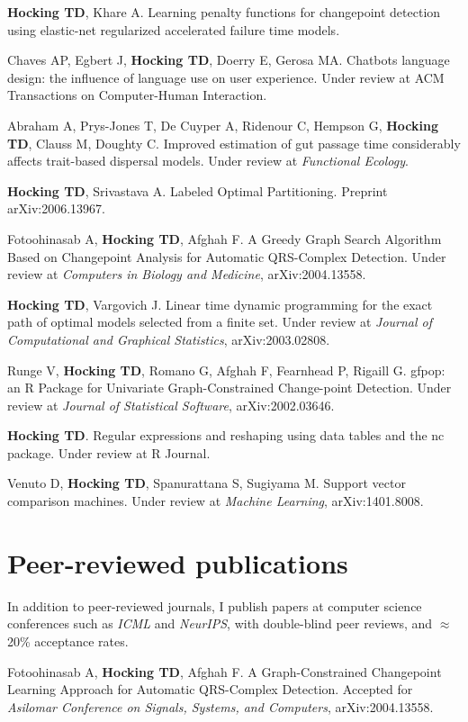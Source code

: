 \documentclass[margin,line]{res}
\begin{document}
\begin{resume}
{\bf Hocking TD}, Khare A. Learning penalty functions for changepoint
detection using elastic-net regularized accelerated failure time
models.

Chaves AP, Egbert J, {\bf Hocking TD}, Doerry E, Gerosa MA. Chatbots
language design: the influence of language use on user
experience. Under review at ACM Transactions on Computer-Human
Interaction.

Abraham A, Prys-Jones T, De Cuyper A, Ridenour C, Hempson G, {\bf
  Hocking TD}, Clauss M, Doughty C. Improved estimation of gut passage
time considerably affects trait-based dispersal models. Under review
at {\it Functional Ecology}.

{\bf Hocking TD}, Srivastava A. Labeled Optimal Partitioning. Preprint
arXiv:2006.13967.

Fotoohinasab A, {\bf Hocking TD}, Afghah F. A Greedy Graph Search
Algorithm Based on Changepoint Analysis for Automatic QRS-Complex
Detection. Under review at {\it Computers in Biology and Medicine},
arXiv:2004.13558.

{\bf Hocking TD}, Vargovich J. Linear time dynamic programming for the
exact path of optimal models selected from a finite set. Under review
at {\it Journal of Computational and Graphical Statistics},
arXiv:2003.02808.

Runge V, {\bf Hocking TD}, Romano G, Afghah F, Fearnhead P, Rigaill
G. gfpop: an R Package for Univariate Graph-Constrained Change-point
Detection. Under review at {\it Journal of Statistical Software},
arXiv:2002.03646.

{\bf Hocking TD}. Regular expressions and reshaping using data tables
and the nc package. Under review at R Journal.

Venuto D, {\bf Hocking TD}, Spanurattana S, Sugiyama M. Support vector
comparison machines. Under review at {\it Machine Learning},
arXiv:1401.8008.

\section{\sc Peer-reviewed publications}

In addition to peer-reviewed journals, I publish papers at
computer science conferences such as {\it ICML} and {\it NeurIPS}, with
double-blind peer reviews, and $\approx$20\% acceptance rates.

Fotoohinasab A, {\bf Hocking TD}, Afghah F. A Graph-Constrained Changepoint
Learning Approach for Automatic QRS-Complex Detection. Accepted for
{\it Asilomar Conference on Signals, Systems, and Computers},
arXiv:2004.13558.


\end{resume}
\end{document}
